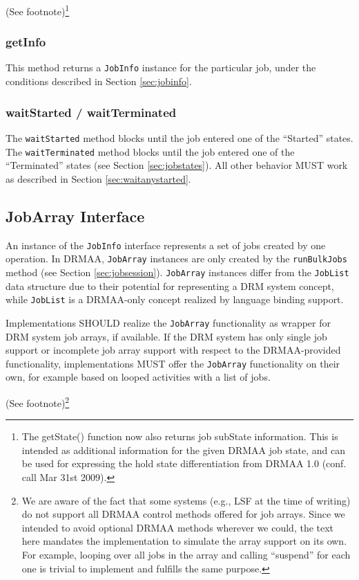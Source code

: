 \documentclass{article}
\newcommand{\h}[1]{\lstinline|#1|}
\newcommand{\rat}[1]{ {\tiny(See footnote)}\footnote{#1} }
\begin{document}
\rat{
The getState() function now also returns job subState information. This is intended as additional information for the given DRMAA job state, and can be used for expressing the hold state differentiation from DRMAA 1.0 (conf. call Mar 31st 2009).
}

\subsubsection{getInfo}

This method returns a \h{JobInfo} instance for the particular job, under the conditions described in Section \ref{sec:jobinfo}. 

\subsubsection{waitStarted / waitTerminated}

The \h{waitStarted} method blocks until the job entered one of the \enquote{Started} states. The \h{waitTerminated} method blocks until the job entered one of the \enquote{Terminated} states (see Section \ref{sec:jobstates}). All other behavior MUST work as described in Section \ref{sec:waitanystarted}.

\subsection{JobArray Interface}
\label{sec:jobarray}

 An instance of the \h{JobInfo} interface represents a set of jobs created by one operation. In DRMAA, \h{JobArray} instances are only created by the \h{runBulkJobs} method (see Section \ref{sec:jobsession}). \h{JobArray} instances differ from the \h{JobList} data structure due to their potential for representing a DRM system concept, while \h{JobList} is a DRMAA-only concept realized by language binding support.

Implementations SHOULD realize the \h{JobArray} functionality as wrapper for DRM system job arrays, if available. If the DRM system has only single job support or incomplete job array support with respect to the DRMAA-provided functionality, implementations MUST offer the \h{JobArray} functionality on their own, for example based on looped activities with a list of jobs.



\rat{
We are aware of the fact that some systems (e.g., LSF at the time of writing) do not support all DRMAA control methods offered for job arrays. Since we intended to avoid optional DRMAA methods wherever we could, the text here mandates the implementation to simulate the array support on its own. For example, looping over all jobs in the array and calling \enquote{suspend} for each one is trivial to implement and fulfills the same purpose.
} 
\end{document}
